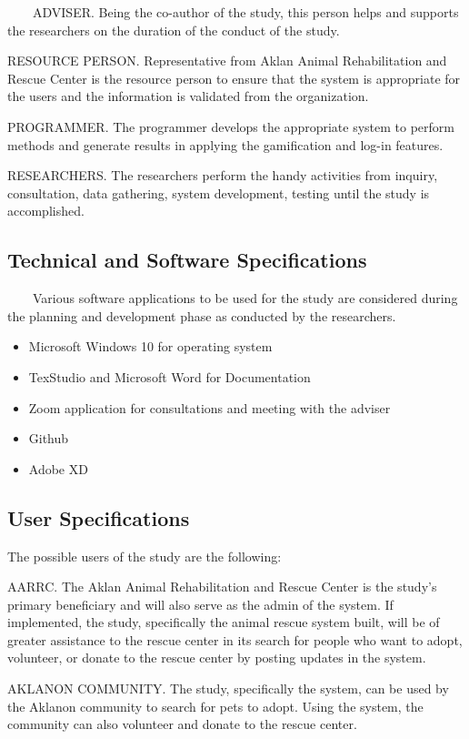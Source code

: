 ~~~~ADVISER. Being the co-author of the study, this person helps and supports the researchers on the duration of the conduct of the study.

RESOURCE PERSON. Representative from Aklan Animal Rehabilitation and Rescue Center is the resource person to ensure that the system is appropriate for the users and the information is validated from the organization.

PROGRAMMER. The programmer develops the appropriate system to perform methods and generate results in applying the gamification and log-in features.

RESEARCHERS. The researchers perform the handy activities from inquiry, consultation, data gathering, system development, testing until the study is accomplished.

\subsection{Technical and Software Specifications}

~~~~Various software applications to be used for the study are considered during the planning and development phase as conducted by the researchers.

\begin{itemize}
	\item Microsoft Windows 10 for operating system
	\item TexStudio and Microsoft Word for Documentation
	\item Zoom application for consultations and meeting with the adviser
	\item Github 
	\item Adobe XD
\end{itemize}

\subsection{User Specifications}

The possible users of the study are the following:

AARRC. The Aklan Animal Rehabilitation and Rescue Center is the study's primary beneficiary and will also serve as the admin of the system. If implemented, the study, specifically the animal rescue system built, will be of greater assistance to the rescue center in its search for people who want to adopt, volunteer, or donate to the rescue center by posting updates in the system.

AKLANON COMMUNITY. The study, specifically the system, can be used by the Aklanon community to search for pets to adopt. Using the system, the community can also volunteer and donate to the rescue center.

